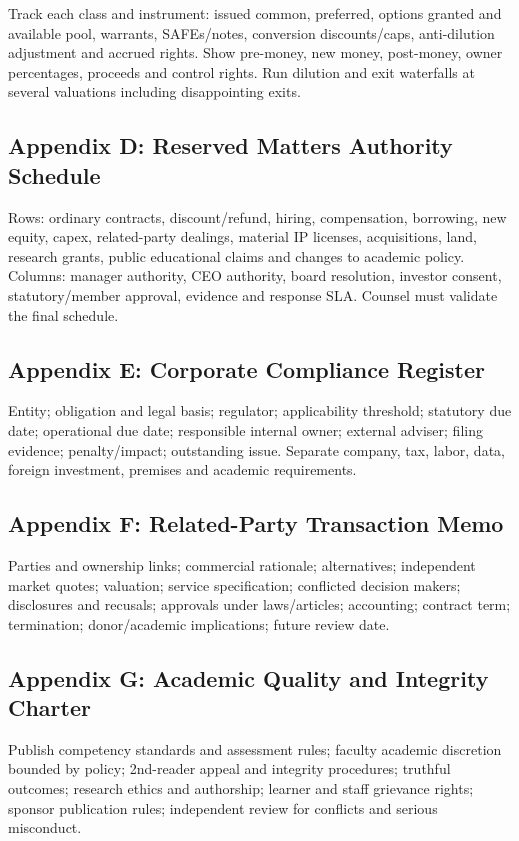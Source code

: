 Track each class and instrument: issued common, preferred, options granted and available pool, warrants, SAFEs/notes, conversion discounts/caps, anti-dilution adjustment and accrued rights. Show pre-money, new money, post-money, owner percentages, proceeds and control rights. Run dilution and exit waterfalls at several valuations including disappointing exits.

\subsection{Appendix D: Reserved Matters Authority Schedule}

Rows: ordinary contracts, discount/refund, hiring, compensation, borrowing, new equity, capex, related-party dealings, material IP licenses, acquisitions, land, research grants, public educational claims and changes to academic policy. Columns: manager authority, CEO authority, board resolution, investor consent, statutory/member approval, evidence and response SLA. Counsel must validate the final schedule.

\subsection{Appendix E: Corporate Compliance Register}

Entity; obligation and legal basis; regulator; applicability threshold; statutory due date; operational due date; responsible internal owner; external adviser; filing evidence; penalty/impact; outstanding issue. Separate company, tax, labor, data, foreign investment, premises and academic requirements.

\subsection{Appendix F: Related-Party Transaction Memo}

Parties and ownership links; commercial rationale; alternatives; independent market quotes; valuation; service specification; conflicted decision makers; disclosures and recusals; approvals under laws/articles; accounting; contract term; termination; donor/academic implications; future review date.

\subsection{Appendix G: Academic Quality and Integrity Charter}

Publish competency standards and assessment rules; faculty academic discretion bounded by policy; 2nd-reader appeal and integrity procedures; truthful outcomes; research ethics and authorship; learner and staff grievance rights; sponsor publication rules; independent review for conflicts and serious misconduct.

